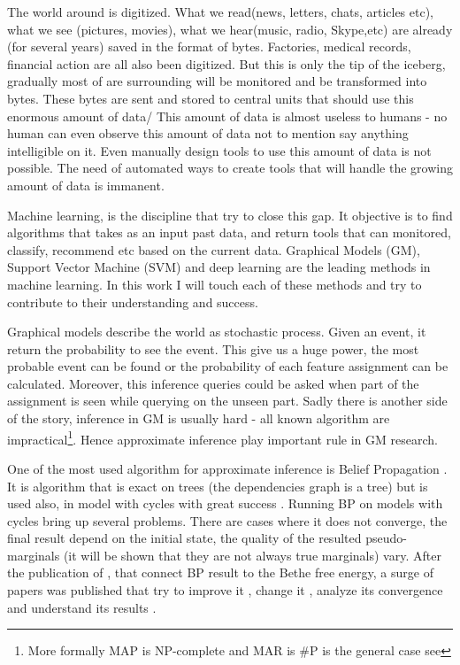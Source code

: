 The world around is digitized.
What we read(news, letters, chats, articles etc), what we see (pictures, movies), what we hear(music, radio, Skype,etc) are already (for several years) saved in the format of bytes.
Factories, medical records, financial action are all also been digitized.
But this is only the tip of the iceberg, gradually most of are surrounding will be monitored and be transformed into  bytes.
These bytes are  sent and stored to central units that should use this enormous amount of data/ 
This amount of data is almost useless to humans - no human can even observe this amount of data not to mention say anything intelligible on it.
Even manually design tools to use this amount of data is not possible.
The need of automated ways to create tools that will handle the growing amount of data is immanent.   

Machine learning, is the discipline that try to close this gap.
It objective is to find algorithms that takes as an input past data, and return tools that can monitored, classify, recommend etc based on the current data.
Graphical Models (GM), Support Vector Machine (SVM) and deep learning are the leading methods in machine learning.
In this work I will touch each of these methods and try to contribute to their understanding and success.

Graphical models describe the world as stochastic process.
Given an event, it return the probability to see the event.
This give us a huge power, the most probable event can be found or the probability of each feature assignment can be calculated.
Moreover, this inference queries could be asked when part of the assignment is seen while querying on the unseen part.
Sadly there is another side of the story, inference in GM is usually hard - all known algorithm are impractical\footnote{More formally MAP is NP-complete and MAR is \#P is the general case see }.
Hence approximate inference play important rule in GM research.

One of the most used algorithm for approximate inference is Belief Propagation \cite{pearl1986fusion}.
It is algorithm that is exact on trees (the dependencies graph is a tree) but is used also, in model with cycles with great success \cite{willsky2002multiresolution,loeliger2004introduction,kschischang2003codes}.
Running BP on models with cycles bring up several problems.
There are cases where it does not converge, the final result depend on the initial state, the quality of the resulted pseudo-marginals (it will be shown that they are not always true marginals) vary.
After the publication of \cite{yedidia2000generalized}, that connect BP result to the Bethe free energy, a surge of papers was published that try to improve it \cite{elidan2012residual}, change it \cite{welling2001belief,wainwright2003tree,meshi2009convexifying}, analyze its convergence \cite{tatikonda2002loopy,mooij2007sufficient,roosta2008convergence} and understand its results \cite{heskes2002stable,yedidia2005constructing,AlanNips2007,YusukeNips2009,RuozziNips2012}.


